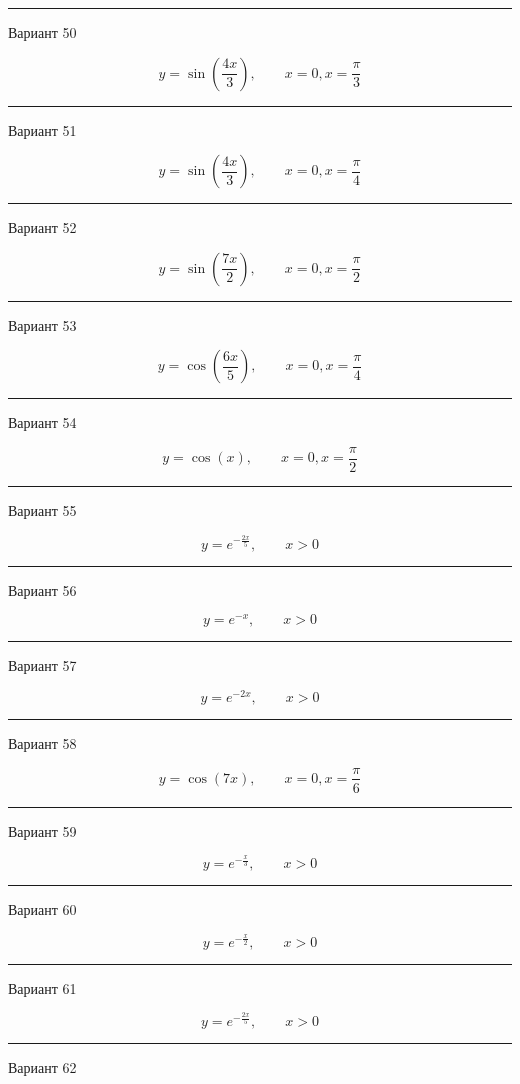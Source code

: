 \documentclass[11pt]{report}
\begin{document}
\rule{\textwidth}{.2mm}

Вариант 50

$$y=\sin{\left(\frac{4 x}{3} \right)}, \qquad x = 0, x = \frac{\pi}{3}$$

\rule{\textwidth}{.2mm}

Вариант 51

$$y=\sin{\left(\frac{4 x}{3} \right)}, \qquad x = 0, x = \frac{\pi}{4}$$

\rule{\textwidth}{.2mm}

Вариант 52

$$y=\sin{\left(\frac{7 x}{2} \right)}, \qquad x = 0, x = \frac{\pi}{2}$$

\rule{\textwidth}{.2mm}

Вариант 53

$$y=\cos{\left(\frac{6 x}{5} \right)}, \qquad x = 0, x = \frac{\pi}{4}$$

\rule{\textwidth}{.2mm}

Вариант 54

$$y=\cos{\left(x \right)}, \qquad x = 0, x = \frac{\pi}{2}$$

\rule{\textwidth}{.2mm}

Вариант 55

$$y=e^{- \frac{2 x}{5}}, \qquad x > 0$$

\rule{\textwidth}{.2mm}

Вариант 56

$$y=e^{- x}, \qquad x > 0$$

\rule{\textwidth}{.2mm}

Вариант 57

$$y=e^{- 2 x}, \qquad x > 0$$

\rule{\textwidth}{.2mm}

Вариант 58

$$y=\cos{\left(7 x \right)}, \qquad x = 0, x = \frac{\pi}{6}$$

\rule{\textwidth}{.2mm}

Вариант 59

$$y=e^{- \frac{x}{3}}, \qquad x > 0$$

\rule{\textwidth}{.2mm}

Вариант 60

$$y=e^{- \frac{x}{2}}, \qquad x > 0$$

\rule{\textwidth}{.2mm}

Вариант 61

$$y=e^{- \frac{2 x}{5}}, \qquad x > 0$$

\rule{\textwidth}{.2mm}

Вариант 62
\end{document}
